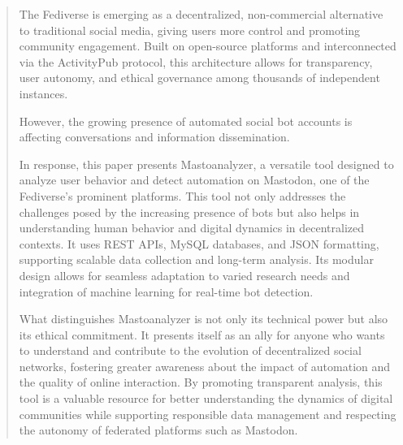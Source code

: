 \begin{abstract}

The Fediverse is emerging as a decentralized, non-commercial alternative to traditional social media, giving users more control and promoting community engagement. Built on open-source platforms and interconnected via the ActivityPub protocol, this architecture allows for transparency, user autonomy, and ethical governance among thousands of independent instances.

However, the growing presence of automated social bot accounts is affecting conversations and information dissemination.

In response, this paper presents Mastoanalyzer, a versatile tool designed to analyze user behavior and detect automation on Mastodon, one of the Fediverse's prominent platforms. This tool not only addresses the challenges posed by the increasing presence of bots but also helps in understanding human behavior and digital dynamics in decentralized contexts. It uses REST APIs, MySQL databases, and JSON formatting, supporting scalable data collection and long-term analysis. Its modular design allows for seamless adaptation to varied research needs and integration of machine learning for real-time bot detection.

What distinguishes Mastoanalyzer is not only its technical power but also its ethical commitment. It presents itself as an ally for anyone who wants to understand and contribute to the evolution of decentralized social networks, fostering greater awareness about the impact of automation and the quality of online interaction. By promoting transparent analysis, this tool is a valuable resource for better understanding the dynamics of digital communities while supporting responsible data management and respecting the autonomy of federated platforms such as Mastodon.
\end{abstract}

\let\cleardoublepage\clearpage